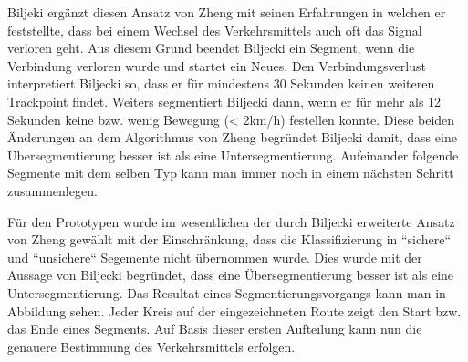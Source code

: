 Biljeki ergänzt diesen Ansatz von Zheng mit seinen Erfahrungen in welchen er feststellte, dass bei einem Wechsel des Verkehrsmittels auch oft das Signal verloren geht. Aus diesem Grund beendet Biljecki ein Segment, wenn die Verbindung verloren wurde und startet ein Neues. Den Verbindungsverlust interpretiert Biljecki so, dass er für mindestens 30 Sekunden keinen weiteren Trackpoint findet. Weiters segmentiert Biljecki dann, wenn er für mehr als 12 Sekunden keine bzw. wenig Bewegung (< 2km/h) festellen konnte. Diese beiden Änderungen an dem Algorithmus von Zheng begründet Biljecki damit, dass eine Übersegmentierung besser ist als eine Untersegmentierung. Aufeinander folgende Segmente mit dem selben Typ kann man immer noch in einem nächsten Schritt zusammenlegen. \cite{biljecki_transportation_2013}

Für den Prototypen wurde im wesentlichen der durch Biljecki erweiterte Ansatz von Zheng gewählt mit der Einschränkung, dass die Klassifizierung in ``sichere`` und ``unsichere`` Segemente nicht übernommen wurde. Dies wurde mit der Aussage von Biljecki begründet, dass eine Übersegmentierung besser ist als eine Untersegmentierung. Das Resultat eines Segmentierungsvorgangs kann man in Abbildung  sehen. Jeder Kreis auf der eingezeichneten Route zeigt den Start bzw. das Ende eines Segments. Auf Basis dieser ersten Aufteilung kann nun die genauere Bestimmung des Verkehrsmittels erfolgen.

